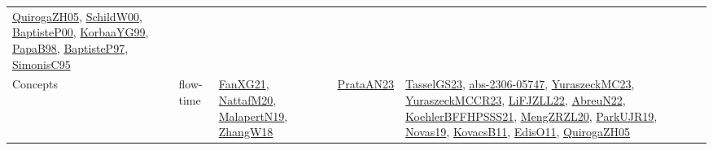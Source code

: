 {\begin{longtable}{lp{3cm}>{\raggedright}p{6cm}>{\raggedright}p{6cm}p{8cm}}
\href{papers/QuirogaZH05.pdf}{QuirogaZH05}\cite{QuirogaZH05}, \href{articles/SchildW00.pdf}{SchildW00}\cite{SchildW00}, \href{articles/BaptisteP00.pdf}{BaptisteP00}\cite{BaptisteP00}, \href{papers/KorbaaYG99.pdf}{KorbaaYG99}\cite{KorbaaYG99}, \href{articles/PapaB98.pdf}{PapaB98}\cite{PapaB98}, \href{papers/BaptisteP97.pdf}{BaptisteP97}\cite{BaptisteP97}, \href{papers/SimonisC95.pdf}{SimonisC95}\cite{SimonisC95}\\
Concepts & flow-time & \href{articles/FanXG21.pdf}{FanXG21}\cite{FanXG21}, \href{papers/NattafM20.pdf}{NattafM20}\cite{NattafM20}, \href{papers/MalapertN19.pdf}{MalapertN19}\cite{MalapertN19}, \href{articles/ZhangW18.pdf}{ZhangW18}\cite{ZhangW18} & \href{articles/PrataAN23.pdf}{PrataAN23}\cite{PrataAN23} & \href{papers/TasselGS23.pdf}{TasselGS23}\cite{TasselGS23}, \href{articles/abs-2306-05747.pdf}{abs-2306-05747}\cite{abs-2306-05747}, \href{papers/YuraszeckMC23.pdf}{YuraszeckMC23}\cite{YuraszeckMC23}, \href{articles/YuraszeckMCCR23.pdf}{YuraszeckMCCR23}\cite{YuraszeckMCCR23}, \href{papers/LiFJZLL22.pdf}{LiFJZLL22}\cite{LiFJZLL22}, \href{articles/AbreuN22.pdf}{AbreuN22}\cite{AbreuN22}, \href{articles/KoehlerBFFHPSSS21.pdf}{KoehlerBFFHPSSS21}\cite{KoehlerBFFHPSSS21}, \href{articles/MengZRZL20.pdf}{MengZRZL20}\cite{MengZRZL20}, \href{papers/ParkUJR19.pdf}{ParkUJR19}\cite{ParkUJR19}, \href{articles/Novas19.pdf}{Novas19}\cite{Novas19}, \href{articles/KovacsB11.pdf}{KovacsB11}\cite{KovacsB11}, \href{papers/EdisO11.pdf}{EdisO11}\cite{EdisO11}, \href{papers/QuirogaZH05.pdf}{QuirogaZH05}\cite{QuirogaZH05}\\

\end{longtable}}
